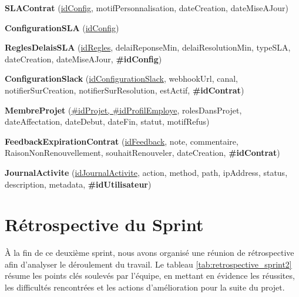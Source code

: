 \noindent\textbf{SLAContrat} (\underline{idConfig}, motifPersonnalisation, dateCreation, dateMiseAJour)

\noindent\textbf{ConfigurationSLA} (\underline{idConfig})

\noindent\textbf{ReglesDelaisSLA} (\underline{idRegles}, delaiReponseMin, delaiResolutionMin, typeSLA, dateCreation, dateMiseAJour, \textbf{\#idConfig})

\noindent\textbf{ConfigurationSlack} (\underline{idConfigurationSlack}, webhookUrl, canal, notifierSurCreation, notifierSurResolution, estActif, \textbf{\#idContrat})

\noindent\textbf{MembreProjet} (\underline{\#idProjet, \#idProfilEmploye}, rolesDansProjet, dateAffectation, dateDebut, dateFin, statut, motifRefus)

\noindent\textbf{FeedbackExpirationContrat} (\underline{idFeedback}, note, commentaire, RaisonNonRenouvellement, souhaitRenouveler, dateCreation, \textbf{\#idContrat})

\noindent\textbf{JournalActivite} (\underline{idJournalActivite}, action, method, path, ipAddress, status, description, metadata, \textbf{\#idUtilisateur})
\section{Rétrospective du Sprint}
\label{sec:retro_sprint2}
À la fin de ce deuxième sprint, nous avons organisé une réunion de rétrospective afin d'analyser le déroulement du travail. Le tableau \ref{tab:retrospective_sprint2} résume les points clés soulevés par l'équipe, en mettant en évidence les réussites, les difficultés rencontrées et les actions d'amélioration pour la suite du projet.

\begingroup
\renewcommand{\arraystretch}{1.15} %

